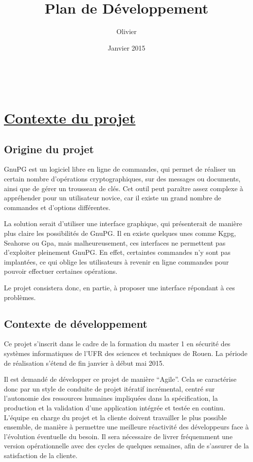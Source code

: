 \documentclass{../res/univ-projet}
\title{Plan de Développement}
\author{Olivier \bsc{Thibault}}
\date{Janvier 2015}
\begin{document}
\maketitle
\newpage
~
\tableofcontents
\newpage

\section{\underline{Contexte du projet}}

\subsection{Origine du projet}

GnuPG est un logiciel libre en ligne de commandes, qui permet de réaliser un certain nombre d'opérations cryptographiques, sur des messages ou 
documents, ainsi que de gérer un trousseau de clés. Cet outil peut paraître assez complexe à appréhender pour un utilisateur novice, 
car il existe un grand nombre de commandes et d'options différentes. 

La solution serait d'utiliser une interface graphique, qui présenterait de manière plus claire les possibilités de GnuPG. Il en existe quelques 
unes comme Kgpg, Seahorse ou Gpa, mais malheureusement, ces interfaces ne permettent pas d'exploiter pleinement GnuPG. En effet, certaintes 
commandes n'y sont pas implantées, ce qui oblige les utilisateurs à revenir en ligne commandes pour pouvoir effectuer certaines opérations. 

Le projet consistera donc, en partie, à proposer une interface répondant à ces problèmes.

\subsection{Contexte de développement}

Ce projet s'inscrit dans le cadre de la formation du master 1 en sécurité des systèmes informatiques de l'UFR des sciences et techniques de Rouen. 
La période de réalisation s'étend de fin janvier à début mai 2015. 

Il est demandé de développer ce projet de manière ``Agile''. Cela se caractérise donc par un style de conduite de projet itératif incrémental, 
centré sur l’autonomie des ressources humaines impliquées dans la spécification, la production et la validation d’une application intégrée et 
testée en continu. L'équipe en charge du projet et la cliente doivent travailler le plus possible ensemble, de manière à permettre une meilleure 
réactivité des développeurs face à l'évolution éventuelle du besoin. Il sera nécessaire de livrer fréquemment une version opérationnelle avec 
des cycles de quelques semaines, afin de s'assurer de la satisfaction de la cliente.
\end{document}
